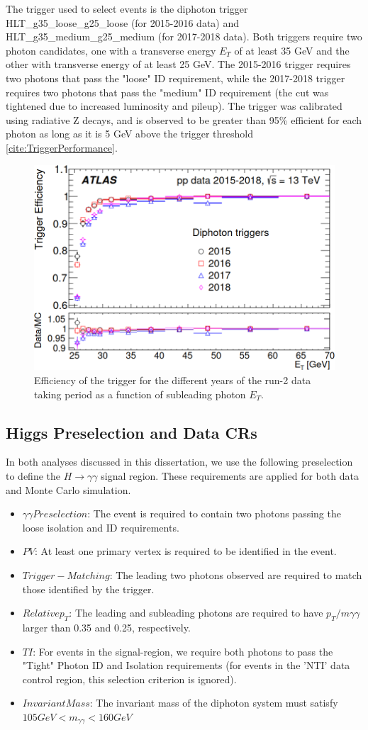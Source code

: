The trigger used to select events is the diphoton trigger HLT\_g35\_loose\_g25\_loose (for 2015-2016 data) and HLT\_g35\_medium\_g25\_medium (for 2017-2018 data). Both triggers require two photon candidates, one with a transverse energy $E_{T}$ of at least 35 GeV and the other with transverse energy of at least 25 GeV. The 2015-2016 trigger requires two photons that pass the "loose" ID requirement, while the 2017-2018 trigger requires two photons that pass the "medium" ID requirement (the cut was tightened due to increased luminosity and pileup). The trigger was calibrated using radiative Z decays, and is observed to be greater than 95\% efficient for each photon as long as it is 5 GeV above the trigger threshold \ref{cite:TriggerPerformance}.

\begin{figure}
\includegraphics[width=0.5\linewidth]{figures/datamc_chapter/trigger.png}
\caption{Efficiency of the trigger for the different years of the run-2 data taking period as a function of subleading photon $E_{T}$.}
\end{figure}

\subsection{Higgs Preselection and Data CRs} \label{sec:Preselection} 

In both analyses discussed in this dissertation, we use the following preselection to define the $H \rightarrow \gamma \gamma$ signal region. These requirements are applied for both data and Monte Carlo simulation. 

\begin{itemize}
\item $\gamma\gamma Preselection$: The event is required to contain two photons passing the loose isolation and ID requirements.
\item $PV$: At least one primary vertex is required to be identified in the event.
\item $Trigger-Matching$: The leading two photons observed are required to match those identified by the trigger.
\item $Relative p_{T}$: The leading and subleading photons are required to have $p_{T}/m\gamma\gamma$ larger than 0.35 and 0.25, respectively.
\item $TI$: For events in the signal-region, we require both photons to pass the "Tight" Photon ID and Isolation requirements (for events in the 'NTI' data control region, this selection criterion is ignored). 
\item $Invariant Mass$: The invariant mass of the diphoton system must satisfy $105 GeV < m_{\gamma\gamma} < 160 GeV$
\end{itemize}

